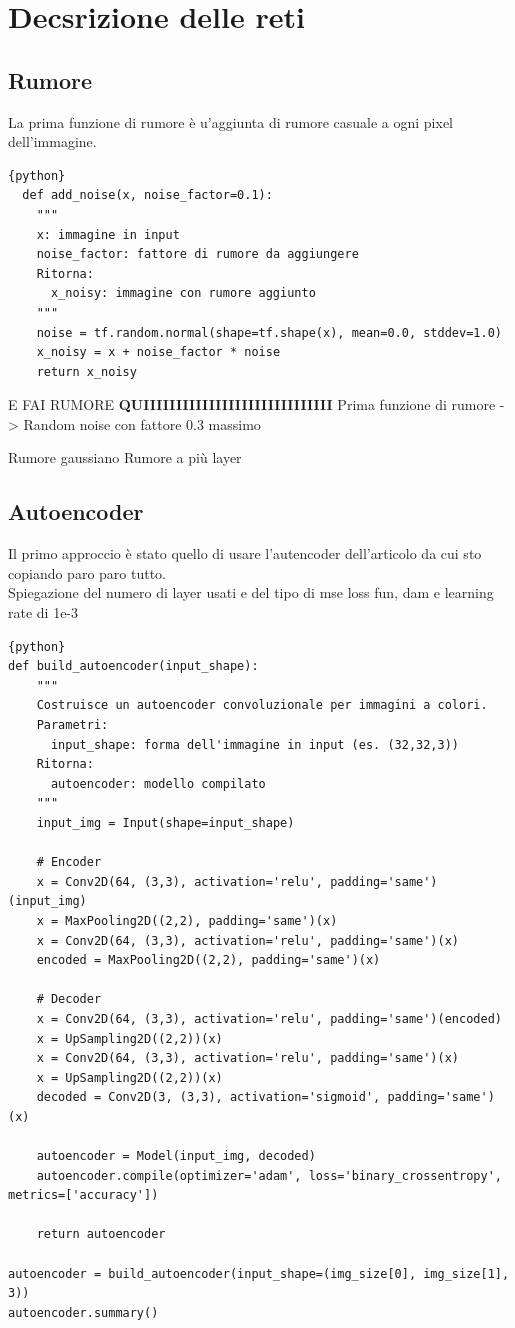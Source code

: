 \documentclass[12pt,a4paper,openright,twoside]{book}
\newcommand{\TODOComment}[1]{}
\begin{document}
\chapter{Decsrizione delle reti}
\section{Rumore}
La prima funzione di rumore è u'aggiunta di rumore casuale a ogni pixel dell'immagine.\\
\begin{lstlisting}{python}
  def add_noise(x, noise_factor=0.1):
    """
    x: immagine in input
    noise_factor: fattore di rumore da aggiungere
    Ritorna:
      x_noisy: immagine con rumore aggiunto
    """
    noise = tf.random.normal(shape=tf.shape(x), mean=0.0, stddev=1.0)
    x_noisy = x + noise_factor * noise
    return x_noisy
\end{lstlisting}
E FAI RUMORE \textbf{QUIIIIIIIIIIIIIIIIIIIIIIIIIIIII}
Prima funzione di rumore -> Random noise con fattore 0.3 massimo
\TODOComment{questi 2 più avanti}
Rumore gaussiano 
Rumore a più layer


\section{Autoencoder}
Il primo approccio è stato quello di usare l'autencoder dell'articolo da cui sto copiando paro paro tutto.\\
Spiegazione del numero di layer usati e del tipo di mse loss fun, dam e learning rate di 1e-3
\begin{lstlisting}{python}
def build_autoencoder(input_shape):
    """
    Costruisce un autoencoder convoluzionale per immagini a colori.
    Parametri:
      input_shape: forma dell'immagine in input (es. (32,32,3))
    Ritorna:
      autoencoder: modello compilato
    """
    input_img = Input(shape=input_shape)

    # Encoder
    x = Conv2D(64, (3,3), activation='relu', padding='same')(input_img)
    x = MaxPooling2D((2,2), padding='same')(x)
    x = Conv2D(64, (3,3), activation='relu', padding='same')(x)
    encoded = MaxPooling2D((2,2), padding='same')(x)

    # Decoder
    x = Conv2D(64, (3,3), activation='relu', padding='same')(encoded)
    x = UpSampling2D((2,2))(x)
    x = Conv2D(64, (3,3), activation='relu', padding='same')(x)
    x = UpSampling2D((2,2))(x)
    decoded = Conv2D(3, (3,3), activation='sigmoid', padding='same')(x)

    autoencoder = Model(input_img, decoded)
    autoencoder.compile(optimizer='adam', loss='binary_crossentropy', metrics=['accuracy'])

    return autoencoder

autoencoder = build_autoencoder(input_shape=(img_size[0], img_size[1], 3))
autoencoder.summary()
\end{lstlisting}
\end{document}

